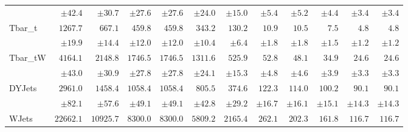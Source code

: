 \begin{landscape}
\begin{table}
\begin{tabular}{l | r r r r r r r r r r r }
                  &$ \pm             42.4 $&$ \pm             30.7 $&$ \pm             27.6 $&$ \pm             27.6 $&$ \pm             24.0 $&$ \pm             15.0 $&$ \pm              5.4 $&$ \pm              5.2 $&$ \pm              4.4 $&$ \pm              3.4 $&$ \pm              3.4 $ \\

          Tbar\_t &$            1267.7 $&$             667.1 $&$             459.8 $&$             459.8 $&$             343.2 $&$             130.2 $&$              10.9 $&$              10.5 $&$               7.5 $&$               4.8 $&$               4.8 $ \\

                  &$ \pm             19.9 $&$ \pm             14.4 $&$ \pm             12.0 $&$ \pm             12.0 $&$ \pm             10.4 $&$ \pm              6.4 $&$ \pm              1.8 $&$ \pm              1.8 $&$ \pm              1.5 $&$ \pm              1.2 $&$ \pm              1.2 $ \\

         Tbar\_tW &$            4164.1 $&$            2148.8 $&$            1746.5 $&$            1746.5 $&$            1311.6 $&$             525.9 $&$              52.8 $&$              48.1 $&$              34.9 $&$              24.6 $&$              24.6 $ \\

                  &$ \pm             43.0 $&$ \pm             30.9 $&$ \pm             27.8 $&$ \pm             27.8 $&$ \pm             24.1 $&$ \pm             15.3 $&$ \pm              4.8 $&$ \pm              4.6 $&$ \pm              3.9 $&$ \pm              3.3 $&$ \pm              3.3 $ \\

           DYJets &$            2961.0 $&$            1458.4 $&$            1058.4 $&$            1058.4 $&$             805.5 $&$             374.6 $&$             122.3 $&$             114.0 $&$             100.2 $&$              90.1 $&$              90.1 $ \\

                  &$ \pm             82.1 $&$ \pm             57.6 $&$ \pm             49.1 $&$ \pm             49.1 $&$ \pm             42.8 $&$ \pm             29.2 $&$ \pm             16.7 $&$ \pm             16.1 $&$ \pm             15.1 $&$ \pm             14.3 $&$ \pm             14.3 $ \\

            WJets &$           22662.1 $&$           10925.7 $&$            8300.0 $&$            8300.0 $&$            5809.2 $&$            2165.4 $&$             262.1 $&$             202.3 $&$             161.8 $&$             116.7 $&$             116.7 $ \\


\end{tabular}
\end{table}
\end{landscape}
